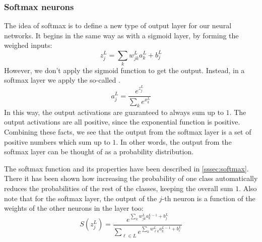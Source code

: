 \subsubsection{Softmax neurons}
The idea of softmax is to define a new type of output layer for our neural networks. It begins in the same way as with a sigmoid layer, by forming the weighed inputs:
\newcommand{\jL}{_j^L}
\begin{equation}
z\jL = \sum_k w_{jk}^L a_k^L + b\jL
\end{equation}
However, we don't apply the sigmoid function to get the output. Instead, in a softmax layer we apply the so-called .
\begin{equation}
a\jL = \frac{e^{z\jL}}{\sum_k e^{x_k^L}}
\end{equation}
In this way, the output activations are guaranteed to always sum up to $1$. The output activations are all positive, since the exponential function is positive. Combining these facts, we see that the output from the softmax layer is a set of positive numbers which sum up to $1$. In other words, the output from the softmax layer can be thought of as a probability distribution.

The softmax function and its properties have been described in \autoref{sssec:softmax}. There it has been shown how increasing the probability of one class automatically reduces the probabilities of the rest of the classes, keeping the overall sum $1$. Also note that for the softmax layer, the output of the $j$-th neuron is a function of the weights of the other neurons in the layer too:
\begin{equation*}
S(z\jL) = \frac{e^{\sum_k w_{jk}^L a_k^{L-1} +b_j^L}}{\sum_{\ell \in L}e^{\sum_k w_{\ell k}^L a_k^{L-1} +b_\ell^L}}
\end{equation*}

